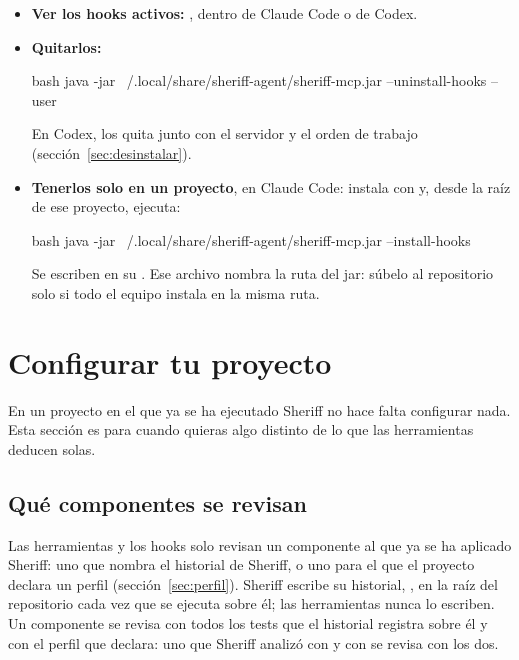 \documentclass[11pt,a4paper]{article}
\begin{document}
\begin{itemize}
  \item \textbf{Ver los hooks activos:} , dentro de Claude Code o de
        Codex.
  \item \textbf{Quitarlos:}
\begin{command}{bash}
java -jar ~/.local/share/sheriff-agent/sheriff-mcp.jar --uninstall-hooks --user
\end{command}
        En Codex,  los quita junto con el servidor y el
        orden de trabajo (sección~\ref{sec:desinstalar}).
  \item \textbf{Tenerlos solo en un proyecto}, en Claude Code: instala con  y,
        desde la raíz de ese proyecto, ejecuta:
\begin{command}{bash}
java -jar ~/.local/share/sheriff-agent/sheriff-mcp.jar --install-hooks
\end{command}
        Se escriben en su . Ese archivo nombra la
        ruta del jar: súbelo al repositorio solo si todo el equipo instala en la
        misma ruta.
\end{itemize}

\section{Configurar tu proyecto}
\label{sec:configurar}

En un proyecto en el que ya se ha ejecutado Sheriff no hace falta configurar
nada. Esta sección es para cuando quieras algo distinto
de lo que las herramientas deducen solas.

\subsection{Qué componentes se revisan}\label{sec:alcance}

Las herramientas y los hooks solo revisan un componente al que ya se ha
aplicado Sheriff: uno que nombra el historial de Sheriff, o uno para el que el
proyecto declara un perfil (sección~\ref{sec:perfil}). Sheriff escribe su
historial, , en la raíz del repositorio cada vez que
se ejecuta sobre él; las herramientas nunca lo escriben. Un componente se
revisa con todos los tests que el historial registra sobre él y con el perfil
que declara: uno que Sheriff analizó con  y con
 se revisa con los dos.
\end{document}
